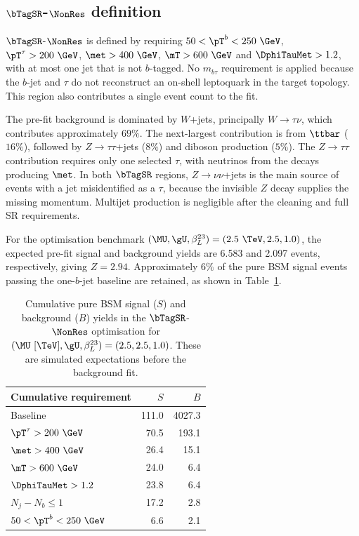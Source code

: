 \clearpage
\subsection[SR1b-NonRes definition]{$\bTagSR$-$\NonRes$ definition}
\label{subsec:ch7_sr1b_nonres}

$\bTagSR$-$\NonRes$ is defined by requiring $50<\pT^b<250~\GeV$, $\pT^\tau>200~\GeV$, $\met>400~\GeV$, $\mT>600~\GeV$ and $\DphiTauMet>1.2$, with at most one jet that is not $b$-tagged.
No $m_{b\tau}$ requirement is applied because the $b$-jet and $\tau$ do not reconstruct an on-shell leptoquark in the target topology.
This region also contributes a single event count to the fit.

The pre-fit background is dominated by $W$+jets, principally $W\to\tau\nu$, which contributes approximately $69\%$.
The next-largest contribution is from $\ttbar$ ($16\%$), followed by $Z\to\tau\tau$+jets ($8\%$) and diboson production ($5\%$).
The $Z\to\tau\tau$ contribution requires only one selected $\tau$, with neutrinos from the decays producing $\met$.
In both $\bTagSR$ regions, $Z\to\nu\nu$+jets is the main source of events with a jet misidentified as a $\tau$, because the invisible $Z$ decay supplies the missing momentum.
Multijet production is negligible after the cleaning and full SR requirements.

For the optimisation benchmark $(\MU,\gU,\beta_L^{23})=(2.5~\TeV,2.5,1.0)$, the expected pre-fit signal and background yields are 6.583 and 2.097 events, respectively, giving $Z=2.94$.
Approximately $6\%$ of the pure BSM signal events passing the one-$b$-jet baseline are retained, as shown in Table~\ref{tab:ch7_cutflow_nonres}.

\begin{table}[htbp]
    \centering
    \small
    \caption{Cumulative pure BSM signal ($S$) and background ($B$) yields in the $\bTagSR$-$\NonRes$ optimisation for $(\MU~[\TeV],\gU,\beta_L^{23})=(2.5,2.5,1.0)$. These are simulated expectations before the background fit.}
    \label{tab:ch7_cutflow_nonres}
    \begin{tabular}{lrr}
        \toprule
        Cumulative requirement & $S$ & $B$ \\
        \midrule
        Baseline & 111.0 & 4027.3 \\
        $\pT^\tau>200~\GeV$ & 70.5 & 193.1 \\
        $\met>400~\GeV$ & 26.4 & 15.1 \\
        $\mT>600~\GeV$ & 24.0 & 6.4 \\
        $\DphiTauMet>1.2$ & 23.8 & 6.4 \\
        $N_j-N_b\leq1$ & 17.2 & 2.8 \\
        $50<\pT^b<250~\GeV$ & 6.6 & 2.1 \\
        \bottomrule
    \end{tabular}
\end{table}

